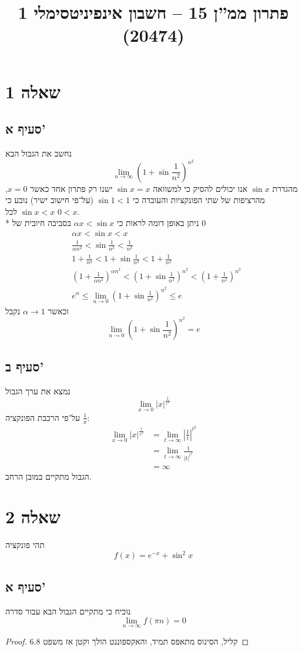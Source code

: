 
\title{פתרון ממ''ן 15 – חשבון אינפיניטסימלי 1 (20474)}


\maketitle
\section{שאלה 1}
\subsection{סעיף א'}
נחשב את הגבול הבא
\[
	\lim_{n \to \infty} {\left( 1 + \sin \frac{1}{n^2} \right)}^{n^2}
\]
מהגדרת $\sin x$ אנו יכולים להסיק כי למשוואה $\sin x = x$ ישנו רק פתרון אחד כאשר $x = 0$,
מהרציפות של שתי הפונקציות והעובדה כי $\sin 1 < 1$ (על־פי חישוב ישיר) נובע כי $\sin x < x$ לכל $0 < x$. \\*
ניתן באופן דומה לראות כי $\alpha x < \sin x$ בסביבה חיובית של $0$
\begin{align*}
	& \alpha x < \sin x < x \\
	& \frac{1}{\alpha n^2} < \sin \frac{1}{n^2} < \frac{1}{n^2} \\
	& 1 + \frac{1}{n^4} < 1 + \sin \frac{1}{n^2} < 1 + \frac{1}{n^2} \\
	& {\left( 1 + \frac{1}{\alpha n^2} \right)}^{\alpha n^2} < {\left( 1 + \sin \frac{1}{n^2} \right)}^{n^2} < {\left(1 + \frac{1}{n^2} \right)}^{n^2} \\
	& e^\alpha \le \lim_{n \to 0} {\left( 1 + \sin \frac{1}{n^2} \right)}^{n^2} \le e
\end{align*}
וכאשר $\alpha \to 1$ נקבל
\[
	\lim_{n \to 0} {\left( 1 + \sin \frac{1}{n^2} \right)}^{n^2} = e
\]

\subsection{סעיף ב'}
נמצא את ערך הגבול
\[
	\lim_{x \to 0} |x|^{\frac{1}{x^2}}
\]
על־פי הרכבת הפונקציה $\frac{1}{x}$:
\begin{align*}
	\lim_{x \to 0} |x|^{\frac{1}{x^2}}
	& = \lim_{t \to \infty} {\left\lvert \frac{1}{t} \right\rvert}^{t^2} \\
	& = \lim_{t \to \infty} \frac{1}{|t|^{t^2} } \\
	& = \infty
\end{align*}
הגבול מתקיים במובן הרחב.

\section{שאלה 2}
תהי פונקציה
\[
	f(x) = e^{-x} + \sin^2 x
\]

\subsection{סעיף א'}
נוכיח כי מתקיים הגבול הבא עבור סדרה
\[
	\lim_{n \to \infty} f(\pi n) = 0
\]
\begin{proof}
	קליל, הסינוס מתאפס תמיד, והאקספוננט הולך וקטן אז משפט 6.8
\end{proof}


